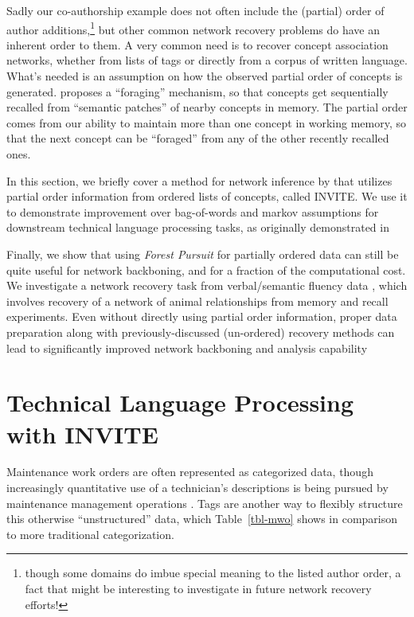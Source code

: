 \documentclass[%
	12pt,
		oneside,
		letterpaper
]{book}
\begin{document}
Sadly our co-authorship example does not often include the (partial)
order of author additions,\footnote{though some domains do imbue special
  meaning to the listed author order, a fact that might be interesting
  to investigate in future network recovery efforts!} but other common
network recovery problems do have an inherent order to them. A very
common need is to recover concept association networks, whether from
lists of tags or directly from a corpus of written language. What's
needed is an assumption on how the observed partial order of concepts is
generated. \textcite{ForagingSemanticFields_Hills2015} proposes a
``foraging'' mechanism, so that concepts get sequentially recalled from
``semantic patches'' of nearby concepts in memory. The partial order
comes from our ability to maintain more than one concept in working
memory, so that the next concept can be ``foraged'' from any of the
other recently recalled
ones\autocite{magicalnumberseven_Miller1956,Dynamicsearchworking_Hills2012}.

In this section, we briefly cover a method for network inference by
\textcite{Humanmemorysearch_Jun2015} that utilizes partial order
information from ordered lists of concepts, called INVITE. We use it to
demonstrate improvement over bag-of-words and markov assumptions for
downstream technical language processing
\autocite{Technicallanguageprocessing_Brundage2021} tasks, as originally
demonstrated in
\autocites{UsingSemanticFluency_Sexton2019}[and][]{OrganizingTaggedKnowledge_Sexton2020}

Finally, we show that using \emph{Forest Pursuit} for partially ordered
data can still be quite useful for network backboning, and for a
fraction of the computational cost. We investigate a network recovery
task from verbal/semantic fluency data
\autocite{Estimatingsemanticnetworks_Zemla2018}, which involves recovery
of a network of animal relationships from memory and recall experiments.
Even without directly using partial order information, proper data
preparation along with previously-discussed (un-ordered) recovery
methods can lead to significantly improved network backboning and
analysis capability

\section{Technical Language Processing with
INVITE}\label{technical-language-processing-with-invite}

Maintenance work orders are often represented as categorized data,
though increasingly quantitative use of a technician's descriptions is
being pursued by maintenance management operations
\autocite{BenchmarkingKeywordExtraction_Sexton2018,CategorizationErrorsData_Sexton2019}.
Tags are another way to flexibly structure this otherwise
``unstructured'' data, which Table~\ref{tbl-mwo} shows in comparison to
more traditional categorization.
\end{document}
